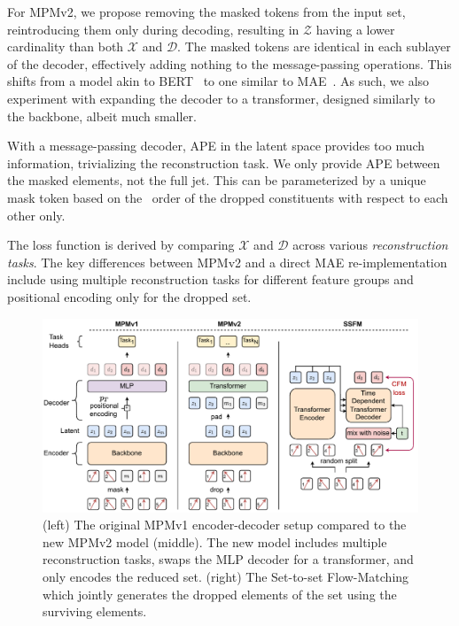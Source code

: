 For MPMv2, we propose removing the masked tokens from the input set, reintroducing them only during decoding, resulting in $\mathcal{Z}$ having a lower cardinality than both $\mathcal{X}$ and $\mathcal{D}$.
The masked tokens are identical in each sublayer of the decoder, effectively adding nothing to the message-passing operations.
This shifts from a model akin to BERT~\cite{BERT} to one similar to MAE~\cite{MAE}.
As such, we also experiment with expanding the decoder to a transformer, designed similarly to the backbone, albeit much smaller.

With a message-passing decoder, APE in the latent space provides too much information, trivializing the reconstruction task.
We only provide APE between the masked elements, not the full jet.
This can be parameterized by a unique mask token based on the \pt~order of the dropped constituents with respect to each other only.

The loss function is derived by comparing $\mathcal{X}$ and $\mathcal{D}$ across various \textit{reconstruction tasks}.
The key differences between MPMv2 and a direct MAE re-implementation include using multiple reconstruction tasks for different feature groups and positional encoding only for the dropped set.

\begin{figure}[t!]
    \centering
    \includegraphics[width=\textwidth]{Figures/foundation_models/mpm2/FlowBert.drawio.pdf}
    \caption{(left) The original MPMv1 encoder-decoder setup compared to the new MPMv2 model (middle). The new model includes multiple reconstruction tasks, swaps the MLP decoder for a transformer, and only encodes the reduced set. (right) The Set-to-set Flow-Matching which jointly generates the dropped elements of the set using the surviving elements.
        \label{fig:models}
    }
\end{figure}

